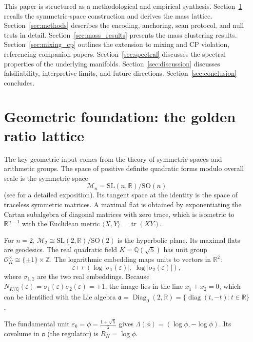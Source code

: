 \documentclass[12pt]{article}
\theoremstyle{definition}
\begin{document}
This paper is structured as a methodological and empirical synthesis. Section~\ref{sec:geom} recalls the symmetric‑space construction and derives the mass lattice. Section~\ref{sec:methods} describes the encoding, anchoring, scan protocol, and null tests in detail. Section~\ref{sec:mass_results} presents the mass clustering results. Section~\ref{sec:mixing_cp} outlines the extension to mixing and CP violation, referencing companion papers. Section~\ref{sec:spectral} discusses the spectral properties of the underlying manifolds. Section~\ref{sec:discussion} discusses falsifiability, interpretive limits, and future directions. Section~\ref{sec:conclusion} concludes.

\section{Geometric foundation: the golden ratio lattice}
\label{sec:geom}

The key geometric input comes from the theory of symmetric spaces and arithmetic groups. The space of positive definite quadratic forms modulo overall scale is the symmetric space
\[
\mathcal{M}_n = \mathrm{SL}(n,\mathbb{R})/\mathrm{SO}(n)
\]
(see \cite{Gentry:ShapeSpace} for a detailed exposition). Its tangent space at the identity is the space of traceless symmetric matrices. A maximal flat is obtained by exponentiating the Cartan subalgebra of diagonal matrices with zero trace, which is isometric to $\mathbb{R}^{n-1}$ with the Euclidean metric $\langle X,Y\rangle = \operatorname{tr}(XY)$.

For $n=2$, $\mathcal{M}_2 \cong \mathrm{SL}(2,\mathbb{R})/\mathrm{SO}(2)$ is the hyperbolic plane. Its maximal flats are geodesics. The real quadratic field $K = \mathbb{Q}(\sqrt5)$ has unit group $\mathcal{O}_K^\times \cong \{\pm1\}\times\mathbb{Z}$. The logarithmic embedding maps units to vectors in $\mathbb{R}^2$:
\[
\varepsilon \longmapsto (\log|\sigma_1(\varepsilon)|,\ \log|\sigma_2(\varepsilon)|),
\]
where $\sigma_{1,2}$ are the two real embeddings. Because $N_{K/\mathbb{Q}}(\varepsilon)= \sigma_1(\varepsilon)\sigma_2(\varepsilon) = \pm1$, the image lies in the line $x_1+x_2=0$, which can be identified with the Lie algebra $\mathfrak{a} = \operatorname{Diag}_0(2,\mathbb{R}) = \{\operatorname{diag}(t,-t) : t\in\mathbb{R}\}$.

The fundamental unit $\varepsilon_0 = \phi = \frac{1+\sqrt5}{2}$ gives $\Lambda(\phi)= (\log\phi, -\log\phi)$. Its covolume in $\mathfrak{a}$ (the regulator) is $R_K = \log\phi$.
\end{document}
